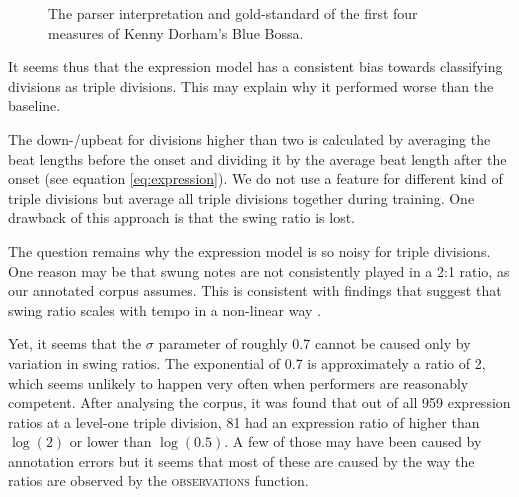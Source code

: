 \begin{figure}
\centering
{}

\caption{The parser interpretation and gold-standard of the first four measures of Kenny Dorham's Blue Bossa.}
\label{fig:blue_bossa}
\end{figure}

It seems thus that the expression model has a consistent bias towards classifying divisions as triple divisions. This may explain why it performed worse than the baseline.

The down-/upbeat for divisions higher than two is calculated by averaging the beat lengths before the onset and dividing it by the average beat length after the onset (see equation \ref{eq:expression}). We do not use a feature for different kind of triple divisions but average all triple divisions together during training. One drawback of this approach is that the swing ratio is lost.

The question remains why the expression model is so noisy for triple divisions. One reason may be that swung notes are not consistently played in a 2:1 ratio, as our annotated corpus assumes. This is consistent with findings that suggest that swing ratio scales with tempo in a non-linear way \citep{honing2008swing}.

Yet, it seems that the $\sigma$ parameter of roughly 0.7 cannot be caused only by variation in swing ratios. The exponential of 0.7 is approximately a ratio of 2, which seems unlikely to happen very often when performers are reasonably competent. After analysing the corpus, it was found that out of all 959 expression ratios at a level-one triple division, 81 had an expression ratio of higher than $\log(2)$ or lower than $\log(0.5)$. A few of those may have been caused by annotation errors but it seems that most of these are caused by the way the ratios are observed by the \textsc{observations} function.

